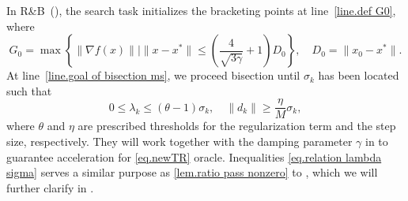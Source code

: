 \documentclass{article}
\begin{document}
\begin{subroutine}[!ht]
    \caption{Ratio Bracketing and Bisection~(R\&B) for }\label{alg.bisection ms}
    \begin{algorithmic}[1]
        \label{line.early termination criterion}
        \label{line.early termination ms}
        \ELSE
        \label{line.goal of bisection ms}
        \STATE{$\sigma_+ =\sigma$}
        \STATE{$\sigma_- =\sigma$}
        \ENDIF
        \ENDWHILE
        \ENDIF
    \end{algorithmic}
\end{subroutine}
In R\&B~(), the search task initializes the bracketing points at line~\ref{line.def G0}, where
$$G_0 = \max\left\{\|\nabla f(x)\| \mid \|x-x^*\|\leq \left(\frac{4}{\sqrt{3\gamma}}+1\right)D_0\right\}, \quad D_0 = \|x_0-x^*\|.$$
At line~\ref{line.goal of bisection ms}, we proceed bisection until $\sigma_k$ has been located such that
\begin{equation}
    \label{eq.relation lambda sigma}
    0 \leq \lambda_k \leq (\theta - 1)\sigma_k, \quad \|d_k\| \geq \frac{\eta}{M} \sigma_k,
\end{equation}
where $\theta$ and $\eta$ are prescribed thresholds for the regularization term and the step size, respectively. They will work together with the damping parameter $\gamma$ in  to guarantee acceleration for \ref{eq.newTR} oracle. Inequalities \eqref{eq.relation lambda sigma} serves a similar purpose as \eqref{lem.ratio pass nonzero} to , which we will further clarify in .
\end{document}
